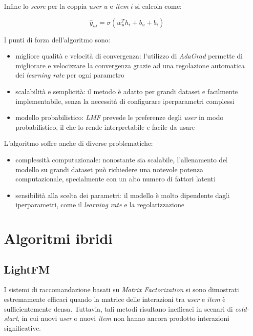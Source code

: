 Infine lo \textit{score} per la coppia \textit{user} $u$ e \textit{item} $i$ si calcola come:

\[
\hat{y}_{ui} = \sigma(w_u^T h_i + b_u + b_i)
\]

I punti di forza dell'algoritmo sono:

\begin{itemize}
    \item migliore qualità e velocità di convergenza: l'utilizzo di \textit{AdaGrad} permette di migliorare e velocizzare la convergenza grazie ad una regolazione automatica dei \textit{learning rate} per ogni parametro
    \item scalabilità e semplicità: il metodo è adatto per grandi dataset e facilmente implementabile, senza la necessità di configurare iperparametri complessi
    \item modello probabilistico: \textit{LMF} prevede le preferenze degli \textit{user} in modo probabilistico, il che lo rende interpretabile e facile da usare
\end{itemize}

L'algoritmo soffre anche di diverse problematiche:

\begin{itemize}
    \item complessità computazionale: nonostante sia scalabile, l'allenamento del modello su grandi dataset può richiedere una notevole potenza computazionale, specialmente con un alto numero di fattori latenti
    \item sensibilità alla scelta dei parametri: il modello è molto dipendente dagli iperparametri, come il \textit{learning rate} e la regolarizzazione
\end{itemize}

\section{Algoritmi ibridi}

\subsection{LightFM}\label{lightfm}

I sistemi di raccomandazione basati su \textit{Matrix Factorization} si sono dimostrati estremamente efficaci quando la matrice delle interazioni tra \textit{user} e \textit{item} è sufficientemente densa. Tuttavia, tali metodi risultano inefficaci in scenari di \textit{cold-start}, in cui nuovi \textit{user} o nuovi \textit{item} non hanno ancora prodotto interazioni significative.

